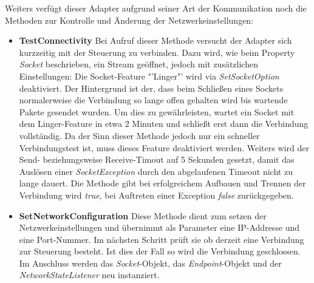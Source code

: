 Weiters verfügt dieser Adapter aufgrund seiner Art der Kommunikation noch die Methoden zur Kontrolle und Änderung der Netzwerkeinstellungen:
\begin{itemize}
\item \textbf{TestConnectivity}
\newline
 Bei Aufruf dieser Methode versucht der Adapter sich kurzzeitig mit der Steuerung zu verbinden. Dazu wird, wie beim Property \textit{Socket} beschrieben, ein Stream geöffnet, jedoch mit zusätzlichen Einstellungen: Die Socket-Feature "'Linger"' wird via \textit{SetSocketOption} deaktiviert. Der Hintergrund ist der, dass beim Schließen eines Sockets normalerweise die Verbindung so lange offen gehalten wird bis wartende Pakete gesendet wurden. Um dies zu gewährleisten, wartet ein Socket mit dem Linger-Feature in etwa 2 Minuten und schließt erst dann die Verbindung vollständig. Da der Sinn dieser Methode jedoch nur ein schneller Verbindungstest ist, muss dieses Feature deaktiviert werden. Weiters wird der Send- beziehungsweise Receive-Timout auf 5 Sekunden gesetzt, damit das Auslösen einer \textit{SocketException} durch den abgelaufenen Timeout nicht zu lange dauert. Die Methode gibt bei erfolgreichem Aufbauen und Trennen der Verbindung wird \textit{true}, bei Auftreten einer Exception \textit{false} zurückgegeben.
\item \textbf{SetNetworkConfiguration}
\newline
Diese Methode dient zum setzen der Netzwerkeinstellungen und übernimmt als Parameter eine IP-Addresse und eine Port-Nummer. Im nächsten Schritt prüft sie ob derzeit eine Verbindung zur Steuerung besteht. Ist dies der Fall so wird die Verbindung geschlossen. Im Anschluss werden das \textit{Socket}-Objekt, das \textit{Endpoint}-Objekt und der \textit{NetworkStateListener} neu instanziert.
\end{itemize}

